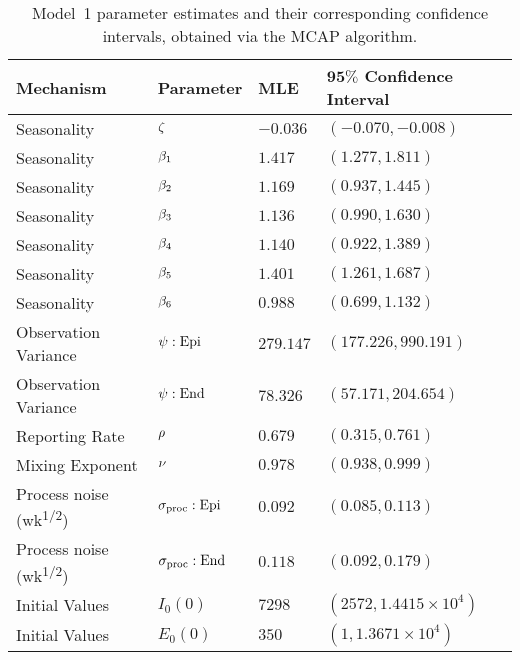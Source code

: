 \begin{table}[!h]
\centering
\caption[Model~1 parameter estimates and confidence intervals.]{\label{tab:mod1CI}Model~1 parameter estimates and their corresponding confidence intervals, obtained via the MCAP algorithm.}
\vspace{2mm}
\begin{tabular}{|L{3.60cm}|C{2.1cm}|C{1.9cm}|C{3.95cm}|}
\hline
\centering \textbf{Mechanism} & \textbf{Parameter} & \textbf{MLE} & $\bm{95\%}$ \textbf{Confidence Interval} \\
\hline
\hline

 Seasonality & $\zeta$ & $-0.036$
   &
  $(-0.070, -0.008)$
\\
\hline

 Seasonality & $\beta_1$ & $1.417$
   &
  $(1.277, 1.811)$
\\
\hline

 Seasonality & $\beta_2$ & $1.169$
   &
  $(0.937, 1.445)$
\\
\hline

 Seasonality & $\beta_3$ & $1.136$
   &
  $(0.990, 1.630)$
\\
\hline

 Seasonality & $\beta_4$ & $1.140$
   &
  $(0.922, 1.389)$
\\
\hline

 Seasonality & $\beta_5$ & $1.401$
   &
  $(1.261, 1.687)$
\\
\hline

 Seasonality & $\beta_6$ & $0.988$
   &
  $(0.699, 1.132)$
\\
\hline

 Observation Variance & $\psi: \mathrm{Epi}$ & $279.147$
   &
  $(177.226, 990.191)$
\\
\hline

 Observation Variance & $\psi: \mathrm{End}$ & $78.326$
   &
  $(57.171, 204.654)$
\\
\hline

  Reporting Rate & $\rho$ & $0.679$
   &
  $(0.315, 0.761)$
\\
\hline

  Mixing Exponent & $\nu$ & $0.978$
   &
  $(0.938, 0.999)$
\\
\hline

  Process noise {\footnotesize (wk\textsuperscript{1/2})} & $\sigma_{\mathrm{proc}}: \mathrm{Epi}$ & $0.092$
   &
  $(0.085, 0.113)$
\\
\hline

  Process noise {\footnotesize (wk\textsuperscript{1/2})} & $\sigma_{\mathrm{proc}}: \mathrm{End}$ & $0.118$
   &
  $(0.092, 0.179)$
\\
\hline

  Initial Values & $I_{0}(0)$ & $7298$
   &
  $(2572, \ensuremath{1.4415\times 10^{4}})$
\\
\hline

  Initial Values & $E_{0}(0)$ & $350$
   &
  $(1, \ensuremath{1.3671\times 10^{4}})$
\\
\hline

\end{tabular}
\end{table}

